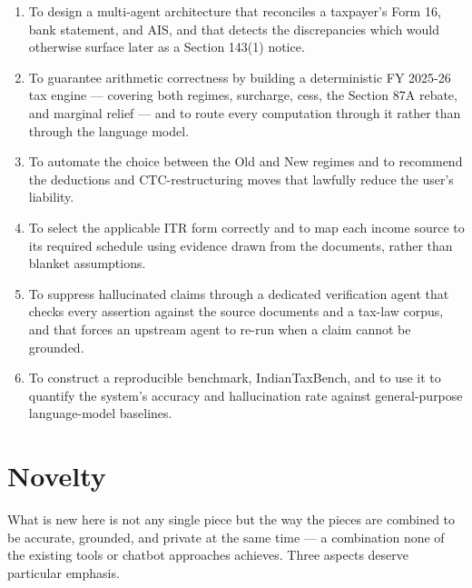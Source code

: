 \documentclass[12pt, a4paper, oneside]{report}
\begin{document}
\begin{enumerate}
    \item To design a multi-agent architecture that reconciles a taxpayer's
          Form 16, bank statement, and AIS, and that detects the discrepancies
          which would otherwise surface later as a Section 143(1) notice.
    \item To guarantee arithmetic correctness by building a deterministic
          FY 2025-26 tax engine --- covering both regimes, surcharge, cess, the
          Section 87A rebate, and marginal relief --- and to route every
          computation through it rather than through the language model.
    \item To automate the choice between the Old and New regimes and to
          recommend the deductions and CTC-restructuring moves that lawfully
          reduce the user's liability.
    \item To select the applicable ITR form correctly and to map each income
          source to its required schedule using evidence drawn from the
          documents, rather than blanket assumptions.
    \item To suppress hallucinated claims through a dedicated verification agent
          that checks every assertion against the source documents and a
          tax-law corpus, and that forces an upstream agent to re-run when a
          claim cannot be grounded.
    \item To construct a reproducible benchmark, IndianTaxBench, and to use it
          to quantify the system's accuracy and hallucination rate against
          general-purpose language-model baselines.
\end{enumerate}

\section{Novelty}
\label{sec:novelty}

What is new here is not any single piece but the way the pieces are combined to
be accurate, grounded, and private at the same time --- a combination none of
the existing tools or chatbot approaches achieves. Three aspects deserve
particular emphasis.
\end{document}
